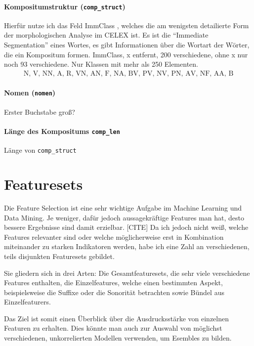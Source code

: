 \paragraph*{Kompositumstruktur (\texttt{comp\_struct})}
Hierfür nutze ich das Feld ImmClass , welches die am wenigsten detailierte Form der morphologischen Analyse im CELEX ist. Es ist die \enquote{Immediate Segmentation} eines Wortes, es gibt Informationen über die Wortart der Wörter, die ein Kompositum formen.
ImmClass, x entfernt, 200 verschiedene, ohne x nur noch 93 verschiedene. Nur Klassen mit mehr als 250 Elementen. 
\begin{gather}
    \textrm{N, V, NN, A, R, VN, AN, F, NA, BV, PV, NV, PN, AV, NF, AA, B}
\end{gather}

\paragraph*{Nomen (\texttt{nomen})}
Erster Buchstabe groß?

\paragraph*{Länge des Kompositums \texttt{comp\_len}}
Länge von \verb'comp_struct'



\section{Featuresets}

Die Feature Selection ist eine sehr wichtige Aufgabe im Machine Learning und Data Mining. Je weniger, dafür jedoch aussagekräftige Features man hat, desto bessere Ergebnisse sind damit erzielbar. [CITE]
Da ich jedoch nicht weiß, welche Features relevanter sind oder welche möglicherweise erst in Kombination miteinander zu starken Indikatoren werden, habe ich eine Zahl an verschiedenen, teils disjunkten Featuresets gebildet.

Sie gliedern sich in drei Arten: Die Gesamtfeaturesets, die sehr viele verschiedene Features enthalten, die Einzelfeatures, welche einen bestimmten Aspekt, beispielsweise die Suffixe oder die Sonorität betrachten sowie Bündel aus Einzelfeaturers.

Das Ziel ist somit einen Überblick über die Ausdrucksstärke von einzelnen Featuren zu erhalten. Dies könnte man auch zur Auswahl von möglichst verschiedenen, unkorrelierten Modellen verwenden, um Esembles zu bilden.

